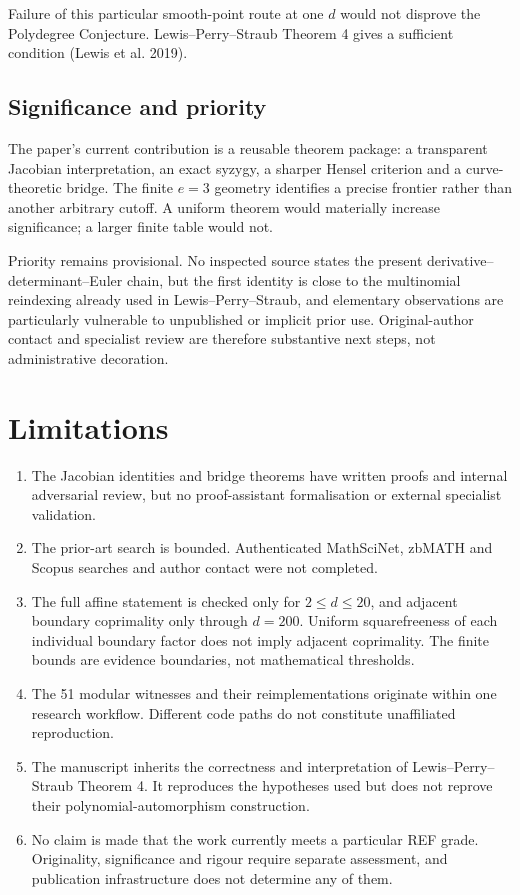 \documentclass[
]{article}
\providecommand{\tightlist}{%
  \setlength{\itemsep}{0pt}\setlength{\parskip}{0pt}}
\begin{document}
Failure of this particular smooth-point route at one \(d\) would not
disprove the Polydegree Conjecture. Lewis--Perry--Straub Theorem 4 gives
a sufficient condition (Lewis et al. 2019).

\subsection{Significance and priority}\label{significance-and-priority}

The paper's current contribution is a reusable theorem package: a
transparent Jacobian interpretation, an exact syzygy, a sharper Hensel
criterion and a curve-theoretic bridge. The finite \(e=3\) geometry
identifies a precise frontier rather than another arbitrary cutoff. A
uniform theorem would materially increase significance; a larger finite
table would not.

Priority remains provisional. No inspected source states the present
derivative--determinant--Euler chain, but the first identity is close to
the multinomial reindexing already used in Lewis--Perry--Straub, and
elementary observations are particularly vulnerable to unpublished or
implicit prior use. Original-author contact and specialist review are
therefore substantive next steps, not administrative decoration.

\section{Limitations}\label{limitations}

\begin{enumerate}
\def\labelenumi{\arabic{enumi}.}
\tightlist
\item
  The Jacobian identities and bridge theorems have written proofs and
  internal adversarial review, but no proof-assistant formalisation or
  external specialist validation.
\item
  The prior-art search is bounded. Authenticated MathSciNet, zbMATH and
  Scopus searches and author contact were not completed.
\item
  The full affine statement is checked only for \(2\le d\le20\), and
  adjacent boundary coprimality only through \(d=200\). Uniform
  squarefreeness of each individual boundary factor does not imply
  adjacent coprimality. The finite bounds are evidence boundaries, not
  mathematical thresholds.
\item
  The 51 modular witnesses and their reimplementations originate within
  one research workflow. Different code paths do not constitute
  unaffiliated reproduction.
\item
  The manuscript inherits the correctness and interpretation of
  Lewis--Perry--Straub Theorem 4. It reproduces the hypotheses used but
  does not reprove their polynomial-automorphism construction.
\item
  No claim is made that the work currently meets a particular REF grade.
  Originality, significance and rigour require separate assessment, and
  publication infrastructure does not determine any of them.
\end{enumerate}
\end{document}
